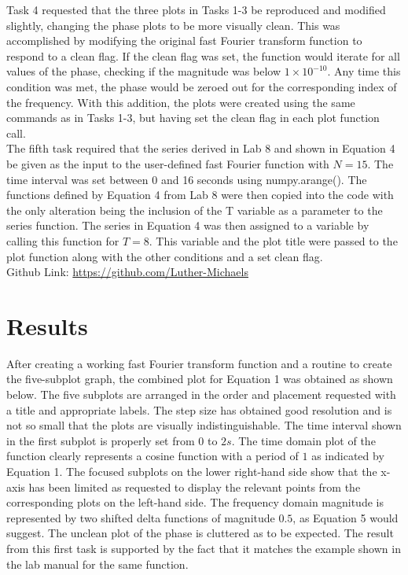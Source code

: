 \documentclass[12pt]{report}
\begin{document}
Task 4 requested that the three plots in Tasks 1-3 be reproduced and modified slightly, changing the phase plots to be more visually clean. This was accomplished by modifying the original fast Fourier transform function to respond to a clean flag. If the clean flag was set, the function would iterate for all values of the phase, checking if the magnitude was below $ 1\times 10^{-10} $. Any time this condition was met, the phase would be zeroed out for the corresponding index of the frequency. With this addition, the plots were created using the same commands as in Tasks 1-3, but having set the clean flag in each plot function call. \\

The fifth task required that the series derived in Lab 8 and shown in Equation 4 be given as the input to the user-defined fast Fourier function with $ N = 15 $. The time interval was set between 0 and 16 seconds using numpy.arange(). The functions defined by Equation 4 from Lab 8 were then copied into the code with the only alteration being the inclusion of the T variable as a parameter to the series function. The series in Equation 4 was then assigned to a variable by calling this function for $ T = 8 $. This variable and the plot title were passed to the plot function along with the other conditions and a set clean flag. \\

Github Link: \url{https://github.com/Luther-Michaels} \\

\section{Results}

After creating a working fast Fourier transform function and a routine to create the five-subplot graph, the combined plot for Equation 1 was obtained as shown below. The five subplots are arranged in the order and placement requested with a title and appropriate labels. The step size has obtained good resolution and is not so small that the plots are visually indistinguishable. The time interval shown in the first subplot is properly set from $ 0 $ to $ 2s $. The time domain plot of the function clearly represents a cosine function with a period of $ 1 $ as indicated by Equation 1. The focused subplots on the lower right-hand side show that the x-axis has been limited as requested to display the relevant points from the corresponding plots on the left-hand side. The frequency domain magnitude is represented by two shifted delta functions of magnitude $ 0.5 $, as Equation 5 would suggest. The unclean plot of the phase is cluttered as to be expected. The result from this first task is supported by the fact that it matches the example shown in the lab manual for the same function. \\
\end{document}
